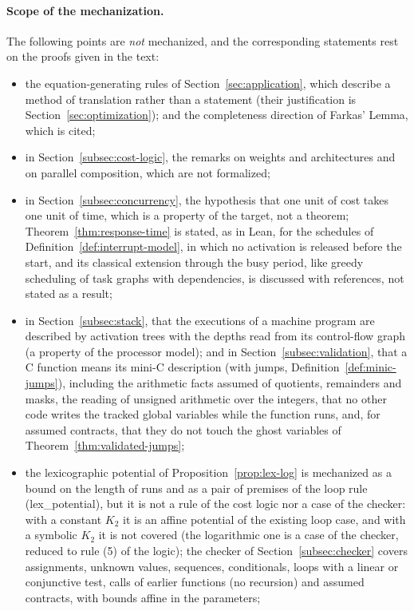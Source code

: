 \documentclass[oneside,english]{amsart}
\numberwithin{equation}{section}
\numberwithin{figure}{section}
\theoremstyle{plain}
\theoremstyle{definition}
\theoremstyle{plain}
\theoremstyle{remark}
\theoremstyle{plain}
\theoremstyle{definition}
\theoremstyle{plain}
\theoremstyle{remark}
\newcommand{\lean}[1]{{\ttfamily\small #1}}
\begin{document}
\paragraph{Scope of the mechanization.}
The following points are \emph{not} mechanized, and the corresponding statements rest on the proofs given in the text:
\begin{itemize}
    \item the equation-generating rules of Section~\ref{sec:application}, which describe a method of translation rather than a statement (their justification is Section~\ref{sec:optimization}); and the completeness direction of Farkas' Lemma, which is cited;
    \item in Section~\ref{subsec:cost-logic}, the remarks on weights and architectures and on parallel composition, which are not formalized;
    \item in Section~\ref{subsec:concurrency}, the hypothesis that one unit of cost takes one unit of time, which is a property of the target, not a theorem; Theorem~\ref{thm:response-time} is stated, as in Lean, for the schedules of Definition~\ref{def:interrupt-model}, in which no activation is released before the start, and its classical extension through the busy period, like greedy scheduling of task graphs with dependencies, is discussed with references, not stated as a result;
    \item in Section~\ref{subsec:stack}, that the executions of a machine program are described by activation trees with the depths read from its control-flow graph (a property of the processor model); and in Section~\ref{subsec:validation}, that a C function means its mini-C description (with jumps, Definition~\ref{def:minic-jumps}), including the arithmetic facts assumed of quotients, remainders and masks, the reading of unsigned arithmetic over the integers, that no other code writes the tracked global variables while the function runs, and, for assumed contracts, that they do not touch the ghost variables of Theorem~\ref{thm:validated-jumps};
    \item the lexicographic potential of Proposition~\ref{prop:lex-log} is mechanized as a bound on the length of runs and as a pair of premises of the loop rule (\lean{lex\_\allowbreak potential}), but it is not a rule of the cost logic nor a case of the checker: with a constant $K_2$ it is an affine potential of the existing loop case, and with a symbolic $K_2$ it is not covered (the logarithmic one is a case of the checker, reduced to rule (5) of the logic); the checker of Section~\ref{subsec:checker} covers assignments, unknown values, sequences, conditionals, loops with a linear or conjunctive test, calls of earlier functions (no recursion) and assumed contracts, with bounds affine in the parameters;

\end{itemize}
\end{document}
